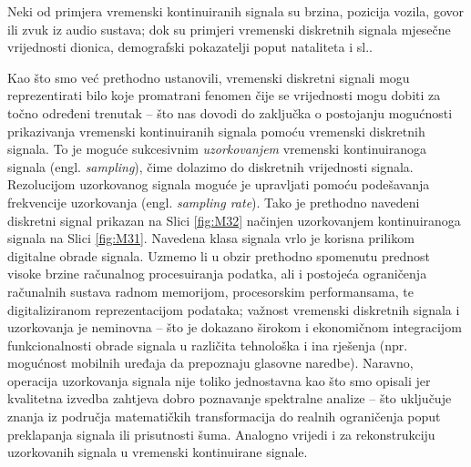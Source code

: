 \documentclass[a4paper,12pt,oneside]{memoir}
\begin{document}
            
            Neki od primjera vremenski kontinuiranih signala su brzina, pozicija vozila, govor ili zvuk iz audio sustava; dok su primjeri vremenski diskretnih signala mjesečne vrijednosti dionica, demografski pokazatelji poput nataliteta i sl..
            
            Kao što smo već prethodno ustanovili, vremenski diskretni signali mogu reprezentirati bilo koje promatrani fenomen čije se vrijednosti mogu dobiti za točno određeni trenutak -- što nas dovodi do zaključka o postojanju mogućnosti prikazivanja vremenski kontinuiranih signala pomoću vremenski diskretnih signala. To je moguće sukcesivnim \textit{uzorkovanjem} vremenski kontinuiranoga signala (engl. \textit{sampling}), čime dolazimo do diskretnih vrijednosti signala. Rezolucijom uzorkovanog signala moguće je upravljati pomoću podešavanja frekvencije uzorkovanja (engl. \textit{sampling rate}). Tako je prethodno navedeni diskretni signal prikazan na Slici \ref{fig:M32} načinjen uzorkovanjem kontinuiranoga signala na Slici \ref{fig:M31}.  Navedena klasa signala vrlo je korisna prilikom digitalne obrade signala. Uzmemo li u obzir prethodno spomenutu prednost visoke brzine računalnog procesuiranja podatka, ali i postojeća ograničenja računalnih sustava radnom memorijom, procesorskim performansama, te digitaliziranom reprezentacijom podataka; važnost vremenski diskretnih signala i uzorkovanja je neminovna -- što je dokazano širokom i ekonomičnom integracijom funkcionalnosti obrade signala u različita tehnološka i ina rješenja (npr. mogućnost mobilnih uređaja da prepoznaju glasovne naredbe). Naravno, operacija uzorkovanja signala nije toliko jednostavna kao što smo opisali jer kvalitetna izvedba zahtjeva dobro poznavanje spektralne analize -- što uključuje znanja iz područja matematičkih transformacija do realnih ograničenja poput preklapanja signala ili prisutnosti šuma. Analogno vrijedi i za rekonstrukciju uzorkovanih signala u vremenski kontinuirane signale.
\end{document}
